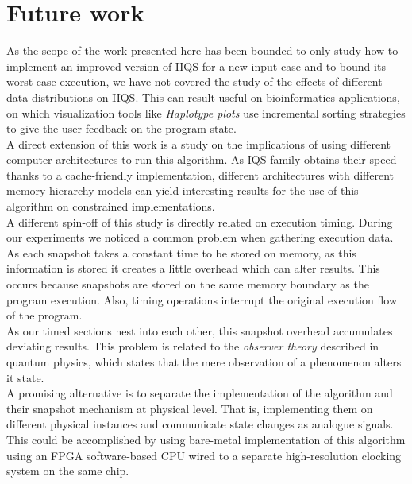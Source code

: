 \section{Future work}

As the scope of the work presented here has been bounded to only study how to implement an improved version of IIQS for a new input case and to bound its worst-case execution, we have not covered the study of the effects of different data distributions on IIQS. This can result useful on bioinformatics applications, on which visualization tools like \emph{Haplotype plots} use incremental sorting strategies to give the user feedback on the program state.\\

A direct extension of this work is a study on the implications of using different computer architectures to run this algorithm. As IQS family obtains their speed thanks to a cache-friendly implementation, different architectures with different memory hierarchy models can yield interesting results for the use of this algorithm on constrained implementations.\\

A different spin-off of this study is directly related on execution timing. During our experiments we noticed a common problem when gathering execution data. As each snapshot takes a constant time to be stored on memory, as this information is stored it creates a little overhead which can alter results. This occurs because snapshots are stored on the same memory boundary as the program execution. Also, timing operations interrupt the original execution flow of the program. \\

As our timed sections nest into each other, this snapshot overhead accumulates deviating results. This problem is related to the \emph{observer theory} described in quantum physics, which states that the mere observation of a phenomenon alters it state. \\

A promising alternative is to separate the implementation of the algorithm and their snapshot mechanism at physical level. That is, implementing them on different physical instances and communicate state changes as analogue signals. This could be accomplished by using bare-metal implementation of this algorithm using an FPGA software-based CPU wired to a separate high-resolution clocking system on the same chip.\\
\FloatBarrier